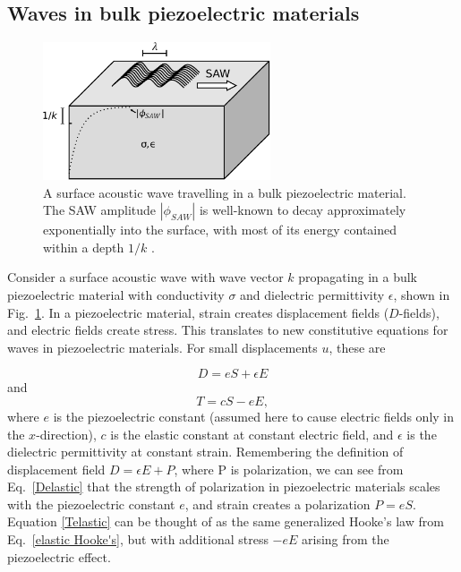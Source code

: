 \documentclass[double,12pt,1in,seploa]{beavtex}
\let\Oldsubsection\subsection
\renewcommand{\subsection}{\FloatBarrier\Oldsubsection}
\begin{document}
\subsection{Waves in bulk piezoelectric materials} \label{waves in bulk piezoelectric materials}
\begin{figure}
    \includegraphics[width = 0.6\textwidth]{SAW in bulk semi.pdf}
    \caption{A surface acoustic wave travelling in a bulk piezoelectric material. The SAW amplitude $|\phi_{SAW}|$ is well-known to decay approximately exponentially into the surface, with most of its energy contained within a depth $1/k$ \cite{wixforth_surface_1989}.}
    \label{SAWbulksemi}
\end{figure}
Consider a surface acoustic wave with wave vector $k$ propagating in a bulk piezoelectric material with conductivity $\sigma$ and dielectric permittivity $\epsilon$, shown in Fig.\ \ref{SAWbulksemi}. In a piezoelectric material, strain creates displacement fields ($D$-fields), and electric fields create stress. This translates to new constitutive equations for waves in piezoelectric materials. For small displacements $u$, these are

\begin{equation} 
    D = eS + \epsilon E \label{Delastic}
\end{equation}
and
\begin{equation} 
    T = cS -eE, \label{Telastic}
\end{equation}
where $e$ is the piezoelectric constant (assumed here to cause electric fields only in the $x$-direction), $c$ is the elastic constant at constant electric field, and $\epsilon$ is the dielectric permittivity at constant strain. Remembering the definition of displacement field $D = \epsilon E + P$, where P is polarization, we can see from Eq.\ \ref{Delastic} that the strength of polarization in piezoelectric materials scales with the piezoelectric constant $e$, and strain creates a polarization $P = eS$. Equation \ref{Telastic} can be thought of as the same generalized Hooke's law from Eq.\ \ref{elastic Hooke's}, but with additional stress $-eE$ arising from the piezoelectric effect. 
\end{document}
